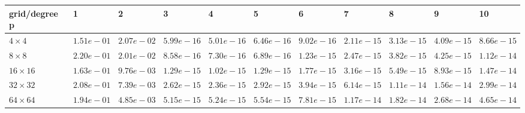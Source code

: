 \begin{tabular}{lllllllllll}
\hline
 grid/degree p   & 1          & 2          & 3          & 4          & 5          & 6          & 7          & 8          & 9          & 10         \\
\hline
 $4 \times 4$    & $1.51e-01$ & $2.07e-02$ & $5.99e-16$ & $5.01e-16$ & $6.46e-16$ & $9.02e-16$ & $2.11e-15$ & $3.13e-15$ & $4.09e-15$ & $8.66e-15$ \\
 $8 \times 8$    & $2.20e-01$ & $2.01e-02$ & $8.58e-16$ & $7.30e-16$ & $6.89e-16$ & $1.23e-15$ & $2.47e-15$ & $3.82e-15$ & $4.25e-15$ & $1.12e-14$ \\
 $16 \times 16$  & $1.63e-01$ & $9.76e-03$ & $1.29e-15$ & $1.02e-15$ & $1.29e-15$ & $1.77e-15$ & $3.16e-15$ & $5.49e-15$ & $8.93e-15$ & $1.47e-14$ \\
 $32 \times 32$  & $2.08e-01$ & $7.39e-03$ & $2.62e-15$ & $2.36e-15$ & $2.92e-15$ & $3.94e-15$ & $6.14e-15$ & $1.11e-14$ & $1.56e-14$ & $2.99e-14$ \\
 $64 \times 64$  & $1.94e-01$ & $4.85e-03$ & $5.15e-15$ & $5.24e-15$ & $5.54e-15$ & $7.81e-15$ & $1.17e-14$ & $1.82e-14$ & $2.68e-14$ & $4.65e-14$ \\
\hline
\end{tabular}